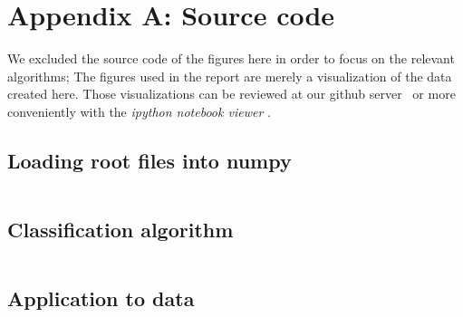 \section{Appendix A: Source code}
We excluded the source code of the figures here in order to focus on the relevant algorithms; 
The figures used in the report are merely a visualization of the data created here. Those visualizations
can be reviewed at our github server~\cite{FPII_Z0} or more conveniently with the \textit{ipython notebook viewer} 
\cite{notebook_viewer}.
\subsection{Loading root files into numpy}
\label{sub:loading_root_into_numpy}
\inputminted[breaklines=true]{python}{analysis/IO.py}    
\subsection{Classification algorithm}
\label{sub:cut.py}
\inputminted[breaklines=true]{python}{analysis/cut.py}    
\subsection{Application to data}
\label{sub:application_to_data}
\inputminted[breaklines=true]{python}{analysis/data_all_gev.py}    
